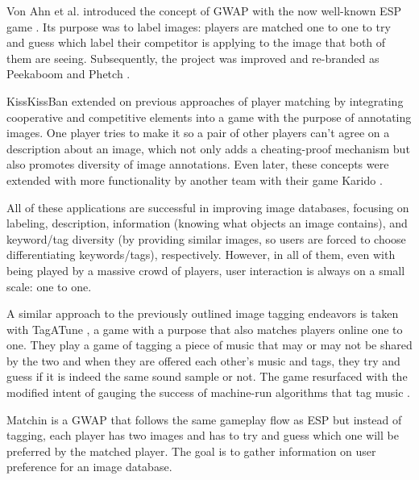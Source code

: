\documentclass[preprint,authoryear,12pt]{elsarticle}
\makeatletter
\renewcommand{\paragraph}{\@startsection{paragraph}{4}{\z@}%
  {-3.25ex\@plus -1ex \@minus -.2ex}%
  {1.5ex \@plus .2ex}%
  {\normalfont\normalsize\mdseries}}
\makeatother
\begin{document}
Von Ahn et al. introduced the concept of GWAP with the now well-known ESP game \citep{vonAhn:2004}. Its purpose was to label images: players are matched one to one to try and guess which label their competitor is applying to the image that both of them are seeing. Subsequently, the project was improved and re-branded as Peekaboom \citep{vonAhn:2006} and Phetch \citep{vonAhn:2007}.

KissKissBan \citep{Ho:2009} extended on previous approaches of player matching by integrating cooperative and competitive elements into a game with the purpose of annotating images. One player tries to make it so a pair of other players can't agree on a description about an image, which not only adds a cheating-proof mechanism but also promotes diversity of image annotations. Even later, these concepts were extended with more functionality by another team with their game Karido \citep{steinmayr2011karido}.

All of these applications are successful in improving image databases, focusing on labeling, description, information (knowing what objects an image contains), and keyword/tag diversity (by providing similar images, so users are forced to choose differentiating keywords/tags), respectively. However, in all of them, even with being played by a massive crowd of players, user interaction is always on a small scale: one to one.


A similar approach to the previously outlined image tagging endeavors is taken with TagATune \citep{Law:2009}, a game with a purpose that also matches players online one to one. They play a game of tagging a piece of music that may or may not be shared by the two and when they are offered each other's music and tags, they try and guess if it is indeed the same sound sample or not. The game resurfaced with the modified intent of gauging the success of machine-run algorithms that tag music \citep{vonAhn&Law:2009}.


Matchin \citep{Hacker:2009} is a GWAP that follows the same gameplay flow as ESP but instead of tagging, each player has two images and has to try and guess which one will be preferred by the matched player. The goal is to gather information on user preference for an image database.
\end{document}
